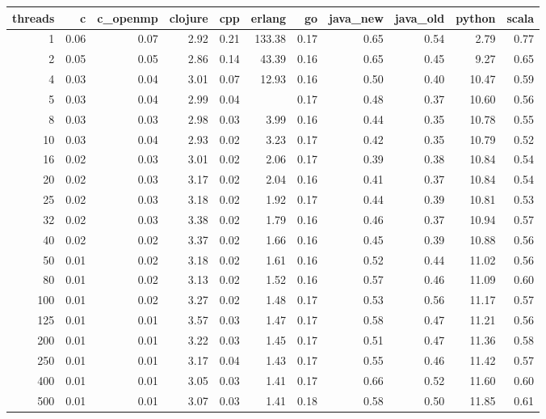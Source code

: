 \begin{table}[ht]
\centering
\begin{tabular}{rrrrrrrrrrr}
  \hline
threads & c & c\_openmp & clojure & cpp & erlang & go & java\_new & java\_old & python & scala \\ 
  \hline
  1 & 0.06 & 0.07 & 2.92 & 0.21 & 133.38 & 0.17 & 0.65 & 0.54 & 2.79 & 0.77 \\ 
    2 & 0.05 & 0.05 & 2.86 & 0.14 & 43.39 & 0.16 & 0.65 & 0.45 & 9.27 & 0.65 \\ 
    4 & 0.03 & 0.04 & 3.01 & 0.07 & 12.93 & 0.16 & 0.50 & 0.40 & 10.47 & 0.59 \\ 
    5 & 0.03 & 0.04 & 2.99 & 0.04 &  & 0.17 & 0.48 & 0.37 & 10.60 & 0.56 \\ 
    8 & 0.03 & 0.03 & 2.98 & 0.03 & 3.99 & 0.16 & 0.44 & 0.35 & 10.78 & 0.55 \\ 
   10 & 0.03 & 0.04 & 2.93 & 0.02 & 3.23 & 0.17 & 0.42 & 0.35 & 10.79 & 0.52 \\ 
   16 & 0.02 & 0.03 & 3.01 & 0.02 & 2.06 & 0.17 & 0.39 & 0.38 & 10.84 & 0.54 \\ 
   20 & 0.02 & 0.03 & 3.17 & 0.02 & 2.04 & 0.16 & 0.41 & 0.37 & 10.84 & 0.54 \\ 
   25 & 0.02 & 0.03 & 3.18 & 0.02 & 1.92 & 0.17 & 0.44 & 0.39 & 10.81 & 0.53 \\ 
   32 & 0.02 & 0.03 & 3.38 & 0.02 & 1.79 & 0.16 & 0.46 & 0.37 & 10.94 & 0.57 \\ 
   40 & 0.02 & 0.02 & 3.37 & 0.02 & 1.66 & 0.16 & 0.45 & 0.39 & 10.88 & 0.56 \\ 
   50 & 0.01 & 0.02 & 3.18 & 0.02 & 1.61 & 0.16 & 0.52 & 0.44 & 11.02 & 0.56 \\ 
   80 & 0.01 & 0.02 & 3.13 & 0.02 & 1.52 & 0.16 & 0.57 & 0.46 & 11.09 & 0.60 \\ 
  100 & 0.01 & 0.02 & 3.27 & 0.02 & 1.48 & 0.17 & 0.53 & 0.56 & 11.17 & 0.57 \\ 
  125 & 0.01 & 0.01 & 3.57 & 0.03 & 1.47 & 0.17 & 0.58 & 0.47 & 11.21 & 0.56 \\ 
  200 & 0.01 & 0.01 & 3.22 & 0.03 & 1.45 & 0.17 & 0.51 & 0.47 & 11.36 & 0.58 \\ 
  250 & 0.01 & 0.01 & 3.17 & 0.04 & 1.43 & 0.17 & 0.55 & 0.46 & 11.42 & 0.57 \\ 
  400 & 0.01 & 0.01 & 3.05 & 0.03 & 1.41 & 0.17 & 0.66 & 0.52 & 11.60 & 0.60 \\ 
  500 & 0.01 & 0.01 & 3.07 & 0.03 & 1.41 & 0.18 & 0.58 & 0.50 & 11.85 & 0.61 \\ 
   \hline
\end{tabular}
\end{table}
